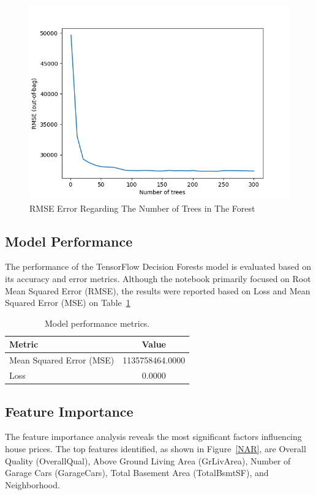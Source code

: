 \documentclass{article}
\begin{document}
\begin{figure}[h]
    \centering
    \includegraphics[width=1\linewidth]{random_forest_plot.png}
    \caption{RMSE Error Regarding The Number of Trees in The Forest}
    \label{RMSE}
\end{figure}



\subsection{Model Performance}
The performance of the TensorFlow Decision Forests model is evaluated based on its accuracy and error metrics. Although the notebook primarily focused on Root Mean Squared Error (RMSE), the results were reported based on Loss and Mean Squared Error (MSE) on Table~\ref{table:performance_metrics}

\begin{table}
\centering
\begin{tabular}{|l|c|}
\hline
\textbf{Metric}             & \textbf{Value}          \\ \hline
Mean Squared Error (MSE)    & 1135758464.0000         \\ \hline
Loss                        & 0.0000                  \\ \hline
\end{tabular}
\caption{Model performance metrics.}
\label{table:performance_metrics}
\end{table}


\subsection{Feature Importance}
The feature importance analysis reveals the most significant factors influencing house prices. The top features identified, as shown in Figure~\ref{NAR}, are Overall Quality (OverallQual), Above Ground Living Area (GrLivArea), Number of Garage Cars (GarageCars), Total Basement Area (TotalBsmtSF), and Neighborhood.
\end{document}
